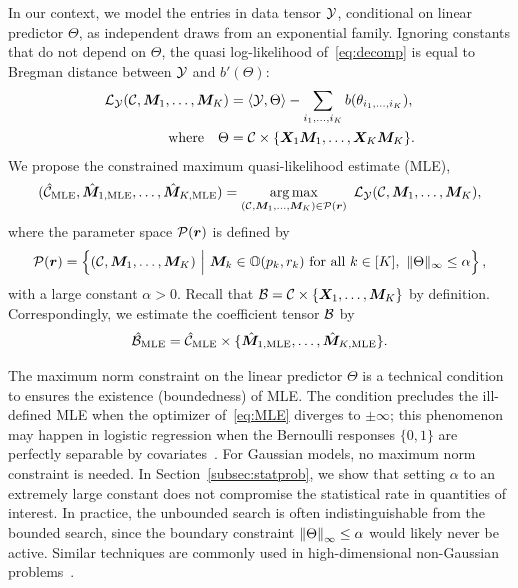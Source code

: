 \documentclass[12pt]{article}
\theoremstyle{definition}
\theoremstyle{definition}
\begin{document}
In our context, we model the entries in data tensor $\mathcal{Y}$, conditional on linear predictor $\Theta$, as independent draws from an exponential family. Ignoring constants that do not depend on $\Theta$, the quasi log-likelihood of~\eqref{eq:decomp} is equal to Bregman distance between $\mathcal{Y}$ and $b'(\Theta)$:
\begin{align}\label{eq:loglikelihood}
\mathcal{L}_{\mathcal{Y}}(\mathcal{C},\bm M_1,\ldots,\bm M_K)&=\langle \mathcal{Y}, \Theta \rangle - \sum_{i_1,\ldots,i_K} b(\theta_{i_1,\ldots,i_K}),\notag \\
 \text{where}\quad \Theta&=\mathcal{C}\times\{\bm X_1\bm M_1,\ldots,\bm X_K\bm M_K\}.
\end{align}
 We propose the constrained maximum quasi-likelihood estimate (MLE),
\begin{align} \label{eq:MLE} 
(\hat \tC_{\text{MLE}}, \hat \mM_{1,\text{MLE}},\ldots,\hat \mM_{K,\text{MLE}}) =\argmax_{(\tC,\mM_1,\ldots,\mM_K)\in \tP(\mr)} \ \tL_{\tY}(\tC,\mM_1,\ldots,\mM_K),
\end{align}
where the parameter space $\mathcal{P}(\bm{r})$ is defined by
\begin{equation}\label{eq:p}
\tP(\mr)=\left\{(\tC, \mM_1,\ldots,\mM_K) \ \Big| \ \mM_k\in\mathbb{O}(p_k,r_k)\ \text{for all }k\in[K],\  \mnormSize{}{\Theta}\leq \alpha \right\},
\end{equation}
with a large constant $\alpha>0$. Recall that $\mathcal{B}=\mathcal{C}\times\{\bm X_1,\ldots,\bm M_K\}$ by definition. Correspondingly, we estimate the coefficient tensor $\mathcal{B}$ by
\[
\hat {\mathcal{B}}_{\text{MLE}}=\hat {\mathcal{C}}_{\text{MLE}}\times\{\hat {\bm M}_{1,\text{MLE}},\ldots,\hat {\bm M}_{K,\text{MLE}}\}.
\] 

The maximum norm constraint on the linear predictor $\Theta$ is a technical condition to ensures the existence (boundedness) of MLE. 
{  The condition precludes the ill-defined MLE when the optimizer of~\eqref{eq:MLE} diverges to $\pm \infty$; this phenomenon may happen in logistic regression when the Bernoulli responses $\{0,1\}$ are perfectly separable by covariates~\citep{wang2020learning}. For Gaussian models, no maximum norm constraint is needed. In Section~\ref{subsec:statprob}, we show that setting $\alpha$ to an extremely large constant does not compromise the statistical rate in quantities of interest. In practice, the unbounded search is often indistinguishable from the bounded search, since the boundary constraint $\left\lVert\Theta\right\rVert_{\infty} \leq \alpha$ would likely never be active. Similar techniques are commonly used in high-dimensional non-Gaussian problems~\citep{wang2020learning,han2020optimal}.}
\end{document}
